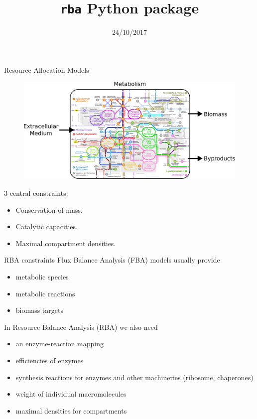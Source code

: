 \documentclass{beamer}
\begin{document}
\title{\texttt{rba} Python package}
\date{24/10/2017}
\maketitle

\begin{frame}{Resource Allocation Models}
  \begin{figure}
    \centering
    \includegraphics[width=\linewidth]{intro}
  \end{figure}
  3 central constraints:
  \begin{itemize}
    \item Conservation of mass.
    \item Catalytic capacities.
    \item Maximal compartment densities.
  \end{itemize}
\end{frame}

\begin{frame}{RBA constraints}
  Flux Balance Analysis (FBA) models usually provide
  \begin{itemize}
    \item metabolic species
    \item metabolic reactions
    \item biomass targets
  \end{itemize}

  In Resource Balance Analysis (RBA) we also need
  \begin{itemize}
    \item an enzyme-reaction mapping
    \item efficiencies of enzymes
    \item synthesis reactions for enzymes
    and other machineries (ribosome, chaperones)
    \item weight of individual macromolecules
    \item maximal densities for compartments
  \end{itemize}
\end{frame}
\end{document}
